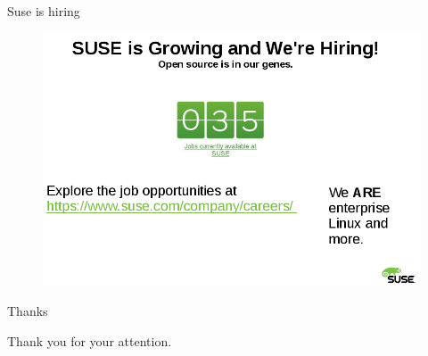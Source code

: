 \documentclass{beamer}
\begin{document}
\begin{frame}{Suse is hiring}
	\begin{figure}
	\includegraphics[width= 0.8\linewidth]{suse_hiring.png}
	\end{figure}
\end{frame}

\begin{frame}{Thanks}
	\begin{center}
	Thank you for your attention.
	\end{center}
\end{frame}
\end{document}
